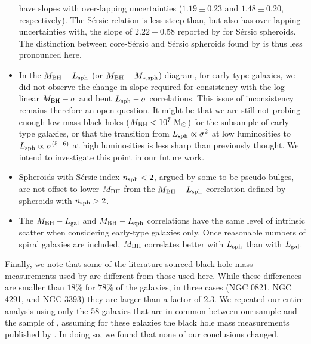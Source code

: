 \documentclass[preprint2]{emulateapj}
\begin{document}
\begin{itemize}
      have slopes with over-lapping uncertainties ($1.19 \pm 0.23$ and $1.48 \pm 0.20$, respectively).  
      The S\'ersic relation is less steep than, but also has over-lapping uncertainties with, 
      the slope of $2.22 \pm 0.58$ reported by \cite{scott2013} for S\'ersic spheroids.  
      The distinction between core-S\'ersic and S\'ersic spheroids found by \cite{scott2013} is thus less pronounced here. 
\item In the $M_{\rm BH} - L_{\rm sph}$ (or $M_{\rm BH} - M_{\rm *,sph}$) diagram, for early-type galaxies, 
      we did not observe the change in slope required for consistency with the log-linear $M_{\rm BH} - \sigma$ and bent $L_{\rm sph} - \sigma$ correlations.
      This issue of inconsistency remains therefore an open question. 
      It might be that we are still not probing enough low-mass black holes ($M_{\rm BH} < 10^7\rm~M_\odot$) 
      for the subsample of early-type galaxies, 
      or that the transition from  $L_{\rm sph} \propto \sigma^2$ at low luminosities to $L_{\rm sph} \propto \sigma^{(5-6)}$ at high luminosities 
      is less sharp than previously thought.
      We intend to investigate this point in our future work. 
\item Spheroids with S\'ersic index $n_{\rm sph}<2$, argued by some to be pseudo-bulges, 
      are not offset to lower $M_{\rm BH}$ from the $M_{\rm BH} - L_{\rm sph}$ correlation defined by spheroids with $n_{\rm sph}>2$. 
\item The $M_{\rm BH} - L_{\rm gal}$ and $M_{\rm BH} - L_{\rm sph}$ correlations have the same level of intrinsic scatter 
      when considering early-type galaxies only. 
      Once reasonable numbers of spiral galaxies are included, 
      $M_{\rm BH}$ correlates better with $L_{\rm sph}$ than with $L_{\rm gal}$. 
\end{itemize} 

Finally, we note that some of the literature-sourced black hole mass measurements used by \cite{kormendyho2013} are different from those used here.  
While these differences are smaller than $18\%$ for $78\%$ of the galaxies, 
in three cases (NGC 0821, NGC 4291, and NGC 3393) they are larger than a factor of $2.3$.  
We repeated our entire analysis using only the 58 galaxies that are in common between our sample and the sample of \cite{kormendyho2013}, 
assuming for these galaxies the black hole mass measurements published by \cite{kormendyho2013}. 
In doing so, we found that none of our conclusions changed.
\end{document}
